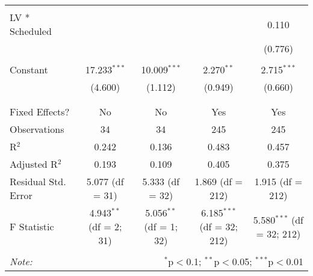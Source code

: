 \begin{table}[!htbp]
\begin{tabular}{@{\extracolsep{5pt}}lcccc}
  & & & & \\ 
 LV * Scheduled &  &  &  & 0.110 \\ 
  &  &  &  & (0.776) \\ 
  & & & & \\ 
 Constant & 17.233$^{***}$ & 10.009$^{***}$ & 2.270$^{**}$ & 2.715$^{***}$ \\ 
  & (4.600) & (1.112) & (0.949) & (0.660) \\ 
  & & & & \\ 
\hline \\[-1.8ex] 
Fixed Effects? & No & No & Yes & Yes \\ 
Observations & 34 & 34 & 245 & 245 \\ 
R$^{2}$ & 0.242 & 0.136 & 0.483 & 0.457 \\ 
Adjusted R$^{2}$ & 0.193 & 0.109 & 0.405 & 0.375 \\ 
Residual Std. Error & 5.077 (df = 31) & 5.333 (df = 32) & 1.869 (df = 212) & 1.915 (df = 212) \\ 
F Statistic & 4.943$^{**}$ (df = 2; 31) & 5.056$^{**}$ (df = 1; 32) & 6.185$^{***}$ (df = 32; 212) & 5.580$^{***}$ (df = 32; 212) \\ 
\hline 
\hline \\[-1.8ex] 
\textit{Note:}  & \multicolumn{4}{r}{$^{*}$p$<$0.1; $^{**}$p$<$0.05; $^{***}$p$<$0.01} \\ 
\end{tabular} 
\end{table} 
